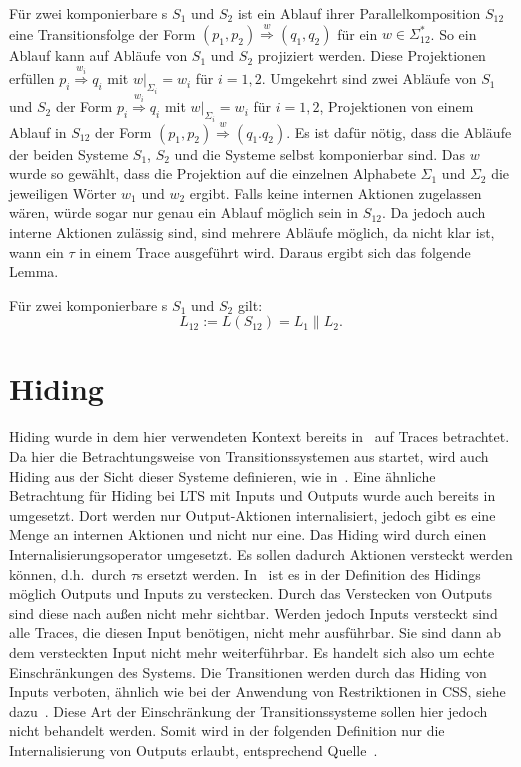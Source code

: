 Für zwei komponierbare \EIO{}s $S_1$ und $S_2$ ist ein Ablauf ihrer
Parallelkomposition $S_{12}$ eine Transitionsfolge der Form $(p_1,p_2)
\overset{w}{\Rightarrow} (q_1,q_2)$ für ein $w\in\Sigma_{12}^*$. So ein Ablauf
kann auf Abläufe von $S_1$ und $S_2$ projiziert werden. Diese Projektionen
erfüllen $p_i \overset{w_i}{\Rightarrow} q_i$ mit $w|_{\Sigma
_i}=w_i$ für $i=1,2$. Umgekehrt sind zwei Abläufe von $S_1$ und $S_2$ der Form
$p_i \overset{w_i}{\Rightarrow} q_i$ mit $w| _{\Sigma _i}= w_i$ für $i=1,2$,
Projektionen von einem Ablauf in $S_{12}$ der Form $(p_1,p_2)
\overset{w}{\Rightarrow} (q_1.q_2)$. Es ist dafür nötig, dass die Abläufe der
beiden Systeme $S_1$, $S_2$ und die Systeme selbst komponierbar sind. Das $w$ wurde so
gewählt, dass die Projektion auf die einzelnen Alphabete $\Sigma _1$ und $\Sigma
_2$ die jeweiligen Wörter $w_1$ und $w_2$ ergibt. Falls keine internen Aktionen
zugelassen wären, würde sogar nur genau ein Ablauf möglich sein in $S_{12}$. Da
jedoch auch interne Aktionen zulässig sind, sind mehrere Abläufe möglich, da
nicht klar ist, wann ein $\tau$ in einem Trace ausgeführt wird. Daraus ergibt
sich das folgende Lemma.

\begin{lem}
\label{LemmaSprache}
  Für zwei komponierbare \EIO{}s $S_1$ und $S_2$ gilt: \[L_{12} := L(S_{12}) =
  L_1\|L_2.\]
\end{lem}

\section{Hiding}

Hiding wurde in dem hier verwendeten Kontext bereits in~\cite{Chilton2013} auf
Traces betrachtet. Da hier die Betrachtungsweise von Transitionssystemen aus
startet, wird auch Hiding aus der Sicht dieser Systeme definieren, wie
in~\cite{Schlosser2012BA}. Eine ähnliche Betrachtung für Hiding bei LTS mit
Inputs und Outputs wurde auch bereits in~\cite{Lynch1996} umgesetzt. Dort
werden nur Output-Aktionen internalisiert, jedoch gibt es eine Menge an
internen Aktionen und nicht nur eine. Das Hiding wird durch einen
Internalisierungsoperator umgesetzt. Es sollen dadurch Aktionen versteckt
werden können, d.h.\ durch $\tau$s ersetzt werden. In~\cite{Chilton2013} ist es
in der Definition des Hidings möglich Outputs und Inputs zu verstecken. Durch
das Verstecken von Outputs sind diese nach außen nicht mehr sichtbar. Werden
jedoch Inputs versteckt sind alle Traces, die diesen Input benötigen, nicht
mehr ausführbar. Sie sind dann ab dem versteckten Input nicht mehr
weiterführbar. Es handelt sich also um echte Einschränkungen des Systems. Die
Transitionen werden durch das Hiding von Inputs verboten, ähnlich wie bei der Anwendung
von Restriktionen in CSS, siehe dazu~\cite{Milner1989}. Diese Art der
Einschränkung der Transitionssysteme sollen hier jedoch nicht behandelt werden.
Somit wird in der folgenden Definition nur die Internalisierung von Outputs
erlaubt, entsprechend Quelle~\cite{Schlosser2012BA}.


